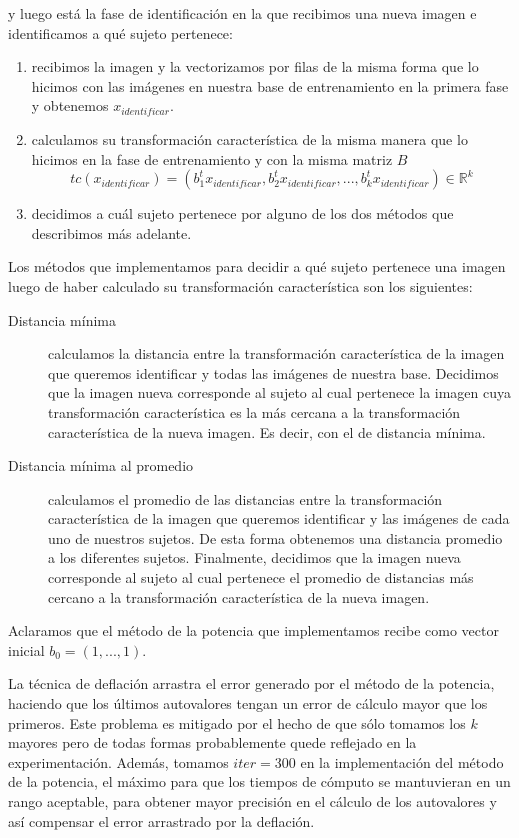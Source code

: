 y luego está la fase de identificación en la que recibimos una nueva imagen e identificamos a qué sujeto pertenece:
\begin{enumerate}
 \item recibimos la imagen y la vectorizamos por filas de la misma forma que lo hicimos con las imágenes en nuestra base de entrenamiento
 en la primera fase y obtenemos $x_{identificar}$.
 
 \item calculamos su transformación característica de la misma manera que lo hicimos en la fase de entrenamiento y con la misma matriz $B$
  \begin{displaymath}
			    tc(x_{identificar}) = ({b_1^t}x_{identificar}, {b_2^t}x_{identificar},..., {b_k^t}x_{identificar})\in\mathbb{R}^k
  \end{displaymath}
 
 \item decidimos a cuál sujeto pertenece por alguno de los dos métodos que describimos más adelante.
\end{enumerate}
Los métodos que implementamos para decidir a qué sujeto pertenece una imagen luego de haber calculado su transformación
característica son los siguientes:
\begin{description}
  \item[Distancia mínima] calculamos la distancia entre la transformación característica de la imagen que queremos identificar
  y todas las imágenes de nuestra base. Decidimos que la imagen nueva corresponde al sujeto al cual pertenece la imagen cuya transformación
  característica es la más cercana a la transformación característica de la nueva imagen. Es decir, con el de distancia mínima.
  \item[Distancia mínima al promedio] calculamos el promedio de las distancias entre la transformación característica de la imagen que 
  queremos identificar y las imágenes de cada uno de nuestros sujetos. De esta forma obtenemos una distancia promedio a los diferentes sujetos.
  Finalmente, decidimos que la imagen nueva corresponde al sujeto al cual pertenece el promedio de distancias más cercano 
  a la transformación característica de la nueva imagen.
\end{description}
Aclaramos que el método de la potencia que implementamos recibe como vector inicial $b_0 = (1,...,1)$.
\par
La técnica de deflación arrastra el error generado por el método de la potencia, haciendo que los últimos autovalores tengan un error 
de cálculo mayor que los primeros. Este problema es mitigado por el hecho de que sólo tomamos los $k$ mayores pero de todas formas 
probablemente quede reflejado en la experimentación. Además, tomamos $iter = 300$ en la implementación del método de la potencia, el
máximo para que los tiempos de cómputo se mantuvieran en un rango aceptable, para obtener mayor precisión en el cálculo de los autovalores
y así compensar el error arrastrado por la deflación.


%



